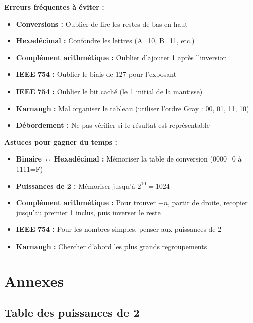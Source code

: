 \documentclass[12pt,a4paper]{article}
\begin{document}
\begin{remarque}
\textbf{Erreurs fréquentes à éviter :}

\begin{itemize}
    \item \textbf{Conversions :} Oublier de lire les restes de bas en haut
    \item \textbf{Hexadécimal :} Confondre les lettres (A=10, B=11, etc.)
    \item \textbf{Complément arithmétique :} Oublier d'ajouter 1 après l'inversion
    \item \textbf{IEEE 754 :} Oublier le biais de 127 pour l'exposant
    \item \textbf{IEEE 754 :} Oublier le bit caché (le 1 initial de la mantisse)
    \item \textbf{Karnaugh :} Mal organiser le tableau (utiliser l'ordre Gray : 00, 01, 11, 10)
    \item \textbf{Débordement :} Ne pas vérifier si le résultat est représentable
\end{itemize}
\end{remarque}

\begin{methode}
\textbf{Astuces pour gagner du temps :}

\begin{itemize}
    \item \textbf{Binaire ↔ Hexadécimal :} Mémoriser la table de conversion (0000=0 à 1111=F)
    \item \textbf{Puissances de 2 :} Mémoriser jusqu'à $2^{10}=1024$
    \item \textbf{Complément arithmétique :} Pour trouver $-n$, partir de droite, recopier jusqu'au premier 1 inclus, puis inverser le reste
    \item \textbf{IEEE 754 :} Pour les nombres simples, penser aux puissances de 2
    \item \textbf{Karnaugh :} Chercher d'abord les plus grands regroupements
\end{itemize}
\end{methode}

\newpage
\section{Annexes}

\subsection*{Table des puissances de 2}
\end{document}
